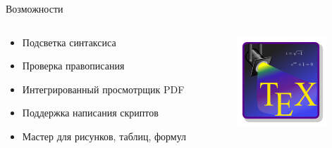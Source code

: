 \documentclass[11pt]{beamer}
\begin{document}
	\begin{frame}{Возможности}
		\begin{columns}[c,onlytextwidth]
			\begin{column}{0.70\textwidth}
				\begin{itemize}
					\item Подсветка синтаксиса
					\item Проверка правописания
					\item Интегрированный просмотрщик PDF
					\item Поддержка написания скриптов
					\item Мастер для рисунков, таблиц, формул
				\end{itemize}
			\end{column}
			\begin{column}{0.25\textwidth}
				\begin{figure}
					\includegraphics[width=\textwidth]{res/Texstudio_Logo.png}
				\end{figure}
			\end{column}
		\end{columns}
	\end{frame}
\end{document}
